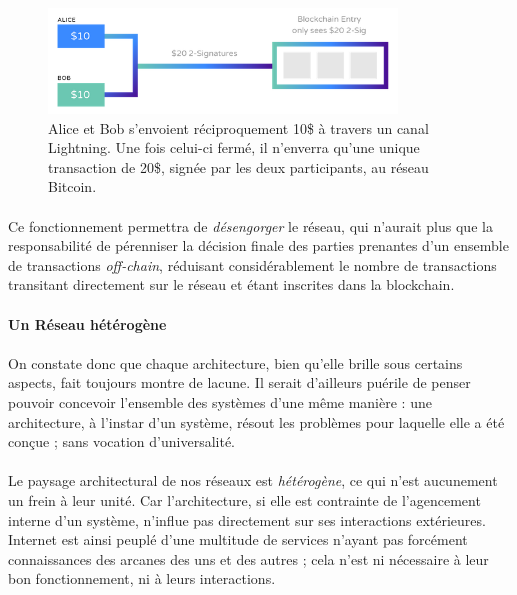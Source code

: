 \begin{figure}[h]
    \centering
    \includegraphics[width=350px]{chapters/02/images/lightning_network.png}
    \caption{\label{lightning_network} Alice et Bob s'envoient réciproquement 10\$ à travers un canal Lightning. Une fois
    celui-ci fermé, il n'enverra qu'une unique transaction de 20\$, signée par les deux participants, au réseau Bitcoin.}
\end{figure}

\paragraph{} Ce fonctionnement permettra de \emph{désengorger} le réseau, qui n'aurait plus que la responsabilité de pérenniser
la décision finale des parties prenantes d'un ensemble de transactions \emph{off-chain}, réduisant considérablement le nombre
de transactions transitant directement sur le réseau et étant inscrites dans la blockchain.


\paragraph{Un Réseau hétérogène}

\paragraph{} On constate donc que chaque architecture, bien qu'elle brille sous certains aspects, fait toujours montre de
lacune. Il serait d'ailleurs puérile de penser pouvoir concevoir l'ensemble des systèmes d'une même manière : une architecture,
à l'instar d'un système, résout les problèmes pour laquelle elle a été conçue ; sans vocation d'universalité.

\paragraph{} Le paysage architectural de nos réseaux est \emph{hétérogène}, ce qui n'est aucunement un frein à leur unité.
Car l'architecture, si elle est contrainte de l'agencement interne d'un système, n'influe pas directement sur ses interactions
extérieures. Internet est ainsi peuplé d'une multitude de services n'ayant pas forcément connaissances des arcanes des uns et
des autres ; cela n'est ni nécessaire à leur bon fonctionnement, ni à leurs interactions.